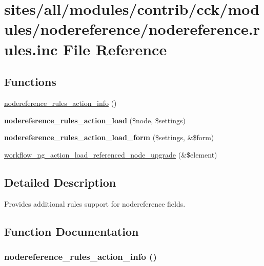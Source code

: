\hypertarget{nodereference_8rules_8inc}{
\section{sites/all/modules/contrib/cck/modules/nodereference/nodereference.rules.inc File Reference}
\label{nodereference_8rules_8inc}
}
\subsection*{Functions}
\begin{CompactItemize}
\item 
\hyperlink{nodereference_8rules_8inc_db6687c68d90b057b8f2ba404a338ad5}{nodereference\_\-rules\_\-action\_\-info} ()
\item 
\hypertarget{nodereference_8rules_8inc_ce2cd30e290a734ad476ca3e0006a37a}{
\textbf{nodereference\_\-rules\_\-action\_\-load} (\$node, \$settings)}
\label{nodereference_8rules_8inc_ce2cd30e290a734ad476ca3e0006a37a}

\item 
\hypertarget{nodereference_8rules_8inc_6a62e481a2ac8b3b948fa1bbd74cebb7}{
\textbf{nodereference\_\-rules\_\-action\_\-load\_\-form} (\$settings, \&\$form)}
\label{nodereference_8rules_8inc_6a62e481a2ac8b3b948fa1bbd74cebb7}

\item 
\hyperlink{nodereference_8rules_8inc_f1c8deb119cb0faed852ec676b4929c8}{workflow\_\-ng\_\-action\_\-load\_\-referenced\_\-node\_\-upgrade} (\&\$element)
\end{CompactItemize}


\subsection{Detailed Description}
Provides additional rules support for nodereference fields. 

\subsection{Function Documentation}
\hypertarget{nodereference_8rules_8inc_db6687c68d90b057b8f2ba404a338ad5}{
\subsubsection[{nodereference\_\-rules\_\-action\_\-info}]{\setlength{\rightskip}{0pt plus 5cm}nodereference\_\-rules\_\-action\_\-info ()}}
\label{nodereference_8rules_8inc_db6687c68d90b057b8f2ba404a338ad5}


